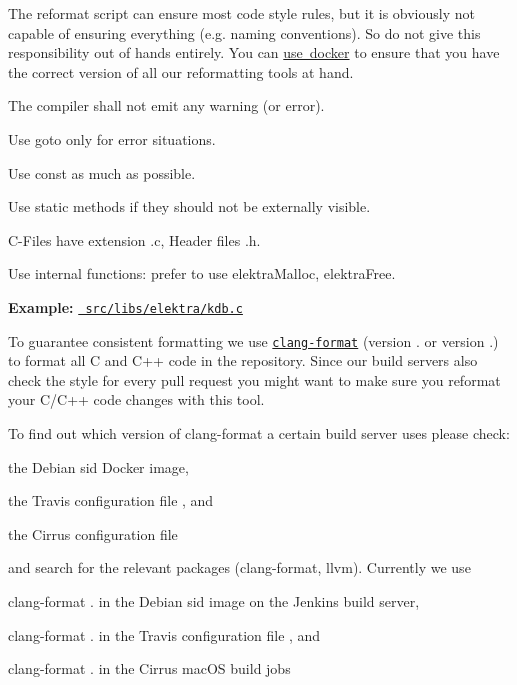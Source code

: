 The reformat script can ensure most code style rules, but it is obviously not capable of ensuring everything (e.\+g. naming conventions). So do not give this responsibility out of hands entirely. You can \mbox{\hyperlink{doc_tutorials_run_reformatting_script_with_docker_md}{use docker}} to ensure that you have the correct version of all our reformatting tools at hand.


\begin{DoxyItemize}
\item The compiler shall not emit any warning (or error).
\item Use goto only for error situations.
\item Use {\ttfamily const} as much as possible.
\item Use {\ttfamily static} methods if they should not be externally visible.
\item C-\/\+Files have extension {\ttfamily .c}, Header files {\ttfamily .h}.
\item Use internal functions\+: prefer to use {\ttfamily elektra\+Malloc}, {\ttfamily elektra\+Free}.
\end{DoxyItemize}

{\bfseries{Example\+:}} \href{/home/mpranj/workspace/libelektra/src/libs/elektra/kdb.c}{\texttt{ src/libs/elektra/kdb.\+c}}

To guarantee consistent formatting we use \href{https://clang.llvm.org/docs/ClangFormat.html}{\texttt{ {\ttfamily clang-\/format}}} (version {.} or version {.}) to format all C and C++ code in the repository. Since our build servers also check the style for every pull request you might want to make sure you reformat your C/\+C++ code changes with this tool.

To find out which version of {\ttfamily clang-\/format} a certain build server uses please check\+:


\begin{DoxyItemize}
\item the Debian sid Docker image,
\item the Travis configuration file , and
\item the Cirrus configuration file
\end{DoxyItemize}

and search for the relevant packages ({\ttfamily clang-\/format}, {\ttfamily llvm}). Currently we use


\begin{DoxyItemize}
\item clang-\/format {.} in the Debian sid image on the Jenkins build server,
\item clang-\/format {.} in the Travis configuration file , and
\item clang-\/format {.} in the Cirrus mac\+OS build jobs
\end{DoxyItemize}

